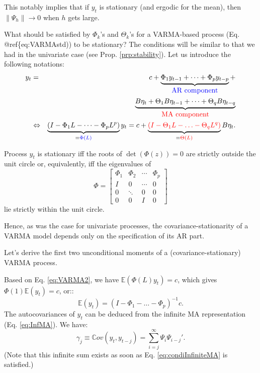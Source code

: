 \documentclass[
]{book}
\theoremstyle{definition}
\theoremstyle{definition}
\theoremstyle{definition}
\theoremstyle{definition}
\theoremstyle{remark}
\begin{document}
This notably implies that if \(y_t\) is stationary (and ergodic for the mean), then \(\|\Psi_h\|\rightarrow 0\) when \(h\) gets large.

What should be satisfied by \(\Phi_k\)'s and \(\Theta_k\)'s for a VARMA-based process (Eq. @ref\{eq:VARMAstd)) to be stationary? The conditions will be similar to that we had in the univariate case (see Prop. \ref{prp:stability}). Let us introduce the following notations:
\begin{eqnarray}
y_t &=& c + \underbrace{\Phi_1 y_{t-1} + \dots +\Phi_p y_{t-p}}_{\color{blue}{\mbox{AR component}}} +  \label{eq:VARMA2}\\
&&\underbrace{B \eta_t+ \Theta_1 B \eta_{t-1}+ \dots+ \Theta_q B \eta_{t-q}}_{\color{red}{\mbox{MA component}}} \nonumber\\
&\Leftrightarrow& \underbrace{(I - \Phi_1 L - \dots - \Phi_p L^p)}_{= \color{blue}{\Phi(L)}}y_t = c +  \underbrace{ \color{red}{(I - \Theta_1 L - \ldots - \Theta_q L^q)}}_{=\color{red}{\Theta(L)}} B \eta_{t}. \nonumber
\end{eqnarray}

Process \(y_t\) is stationary iff the roots of \(\det(\Phi(z))=0\) are strictly outside the unit circle or, equivalently, iff the eigenvalues of
\begin{equation}
\Phi = \left[\begin{array}{cccc}
\Phi_{1} & \Phi_{2} & \cdots & \Phi_{p}\\
I & 0 & \cdots & 0\\
0 & \ddots & 0 & 0\\
0 & 0 & I & 0\end{array}\right]\label{eq:matrixPHI}
\end{equation}
lie strictly within the unit circle.

Hence, as was the case for univariate processes, the covariance-stationarity of a VARMA model depends only on the specification of its AR part.

Let's derive the first two unconditional moments of a (covariance-stationary) VARMA process.

Based on Eq. \eqref{eq:VARMA2}, we have \(\mathbb{E}(\Phi(L)y_t)=c\), which gives \(\Phi(1)\mathbb{E}(y_t)=c\), or::
\[
\mathbb{E}(y_t) = (I - \Phi_1 - \dots - \Phi_p)^{-1}c.
\]
The autocovariances of \(y_t\) can be deduced from the infinite MA representation (Eq. \eqref{eq:InfMA}). We have:
\[
\gamma_j \equiv \mathbb{C}ov(y_t,y_{t-j}) = \sum_{i=j}^\infty \Psi_i \Psi_{i-j}'.
\]
(Note that this infinite sum exists as soon as Eq. \eqref{eq:condiInfiniteMA} is satisfied.)
\end{document}
